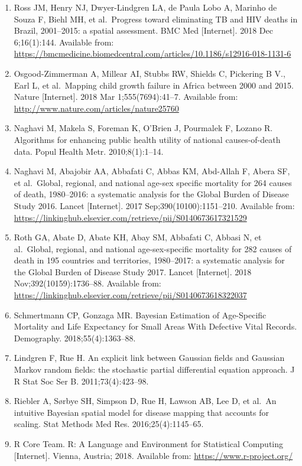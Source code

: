 \documentclass[
]{article}
\begin{document}
\begin{enumerate}
\item
  Ross JM, Henry NJ, Dwyer-Lindgren LA, de Paula Lobo A, Marinho de Souza F, Biehl MH, et al.~Progress toward eliminating TB and HIV deaths in Brazil, 2001--2015: a spatial assessment. BMC Med {[}Internet{]}. 2018 Dec 6;16(1):144. Available from: \url{https://bmcmedicine.biomedcentral.com/articles/10.1186/s12916-018-1131-6}
\item
  Osgood-Zimmerman A, Millear AI, Stubbs RW, Shields C, Pickering B V., Earl L, et al.~Mapping child growth failure in Africa between 2000 and 2015. Nature {[}Internet{]}. 2018 Mar 1;555(7694):41--7. Available from: \url{http://www.nature.com/articles/nature25760}
\item
  Naghavi M, Makela S, Foreman K, O'Brien J, Pourmalek F, Lozano R. Algorithms for enhancing public health utility of national causes-of-death data. Popul Health Metr. 2010;8(1):1--14.
\item
  Naghavi M, Abajobir AA, Abbafati C, Abbas KM, Abd-Allah F, Abera SF, et al.~Global, regional, and national age-sex specific mortality for 264 causes of death, 1980--2016: a systematic analysis for the Global Burden of Disease Study 2016. Lancet {[}Internet{]}. 2017 Sep;390(10100):1151--210. Available from: \url{https://linkinghub.elsevier.com/retrieve/pii/S0140673617321529}
\item
  Roth GA, Abate D, Abate KH, Abay SM, Abbafati C, Abbasi N, et al.~Global, regional, and national age-sex-specific mortality for 282 causes of death in 195 countries and territories, 1980--2017: a systematic analysis for the Global Burden of Disease Study 2017. Lancet {[}Internet{]}. 2018 Nov;392(10159):1736--88. Available from: \url{https://linkinghub.elsevier.com/retrieve/pii/S0140673618322037}
\item
  Schmertmann CP, Gonzaga MR. Bayesian Estimation of Age-Specific Mortality and Life Expectancy for Small Areas With Defective Vital Records. Demography. 2018;55(4):1363--88.
\item
  Lindgren F, Rue H. An explicit link between Gaussian fields and Gaussian Markov random fields: the stochastic partial differential equation approach. J R Stat Soc Ser B. 2011;73(4):423--98.
\item
  Riebler A, Sørbye SH, Simpson D, Rue H, Lawson AB, Lee D, et al.~An intuitive Bayesian spatial model for disease mapping that accounts for scaling. Stat Methods Med Res. 2016;25(4):1145--65.
\item
  R Core Team. R: A Language and Environment for Statistical Computing {[}Internet{]}. Vienna, Austria; 2018. Available from: \url{https://www.r-project.org/}

\end{enumerate}
\end{document}
